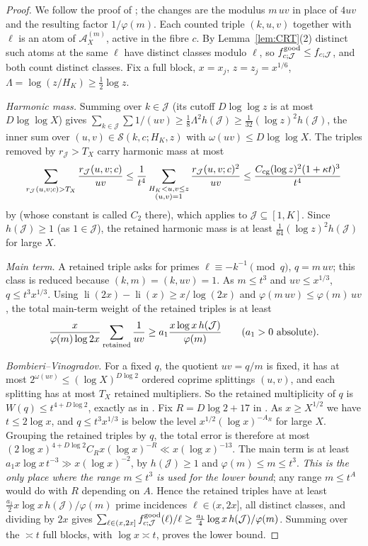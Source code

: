 \documentclass[10pt,reqno]{amsart}
\theoremstyle{definition}
\newcommand{\J}{\mathcal J}
\newcommand{\A}{\mathcal A}
\newcommand{\Sset}{\mathcal S}
\newcommand{\li}{\operatorname{li}}
\begin{document}
\begin{proof}
We follow the proof of \cite[Theorem~4.2]{TQ}; the changes are the
modulus $m\,uv$ in place of $4uv$ and the resulting factor
$1/\varphi(m)$.  Each counted triple $(k,u,v)$ together with $\ell$ is an
atom of $\A^{(m)}_X$, active in the fibre $c$.  By
Lemma~\ref{lem:CRT}(2) distinct such atoms at the same $\ell$ have
distinct classes modulo $\ell$, so $f^{\rm good}_{c;\J}\leq f_{c;\J}$, and
both count distinct classes.  Fix a full block, $x=x_j$, $z=z_j=x^{1/6}$,
$\Lambda=\log(z/H_K)\geq\frac12\log z$.

\emph{Harmonic mass.}  Summing \cite[Lemma~3.3]{TQ} over $k\in\J$ (its
cutoff $D\log\log z$ is at most $D\log\log X$) gives
$\sum_{k\in\J}\sum 1/(uv)\geq\frac18\Lambda^2h(\J)\geq\frac1{32}(\log z)^2h(\J)$,
the inner sum over $(u,v)\in\Sset(k,c;H_K,z)$ with
$\omega(uv)\leq D\log\log X$.  The triples removed by $r_{\J}>T_X$ carry
harmonic mass at most
\[
 \sum_{r_{\J}(u,v;c)>T_X}\frac{r_{\J}(u,v;c)}{uv}
 \leq\frac1{t^4}\sum_{\substack{H_K<u,v\leq z\\(u,v)=1}}\frac{r_{\J}(u,v;c)^2}{uv}
 \leq\frac{C_{\rm cg}(\log z)^2(1+\kappa t)^3}{t^4}
\]
by \cite[Lemma~4.1]{TQ} (whose constant is called $C_2$ there), which applies to $\J\subseteq[1,K]$.  Since
$h(\J)\geq1$ (as $1\in\J$), the retained harmonic mass is at least
$\frac1{64}(\log z)^2h(\J)$ for large $X$.

\emph{Main term.}  A retained triple asks for primes
$\ell\equiv-k^{-1}\pmod q$, $q=m\,uv$; this class is reduced because
$(k,m)=(k,uv)=1$.  As $m\leq t^3$ and $uv\leq x^{1/3}$, $q\leq t^3x^{1/3}$.
Using $\li(2x)-\li(x)\geq x/\log(2x)$ and
$\varphi(m\,uv)\leq\varphi(m)\,uv$, the total main-term weight of the
retained triples is at least
\[
 \frac x{\varphi(m)\log 2x}\sum_{\rm retained}\frac1{uv}
 \geq a_1\frac{x\log x\,h(\J)}{\varphi(m)}\qquad(a_1>0\text{ absolute}).
\]

\emph{Bombieri--Vinogradov.}  For a fixed $q$, the quotient $uv=q/m$ is
fixed, it has at most $2^{\omega(uv)}\leq(\log X)^{D\log2}$ ordered
coprime splittings $(u,v)$, and each splitting has at most $T_X$ retained
multipliers.  So the retained multiplicity of $q$ is
$W(q)\leq t^{4+D\log2}$, exactly as in \cite[(26)]{TQ}.  Fix
$R=D\log2+17$ in \cite[(9)]{TQ}.  As $x\geq X^{1/2}$ we have
$t\leq2\log x$, and $q\leq t^3x^{1/3}$ is below the level
$x^{1/2}(\log x)^{-A_R}$ for large $X$.  Grouping the retained triples by
$q$, the total error is therefore at most
$(2\log x)^{4+D\log2}C_Rx(\log x)^{-R}\ll x(\log x)^{-13}$.  The main term
is at least $a_1x\log x\,t^{-3}\gg x(\log x)^{-2}$, by $h(\J)\geq1$ and
$\varphi(m)\leq m\leq t^3$.  \emph{This is the only place where the
range $m\leq t^3$ is used for the lower bound}; any range
$m\leq t^A$ would do with $R$ depending on $A$.  Hence the retained
triples have at least $\frac{a_1}2x\log x\,h(\J)/\varphi(m)$ prime
incidences $\ell\in(x,2x]$, all distinct classes, and dividing by $2x$
gives $\sum_{\ell\in(x,2x]}f^{\rm good}_{c;\J}(\ell)/\ell\geq\frac{a_1}4\log x\,h(\J)/\varphi(m)$.
Summing over the $\asymp t$ full blocks, with $\log x\asymp t$, proves the
lower bound.


\end{proof}
\end{document}
